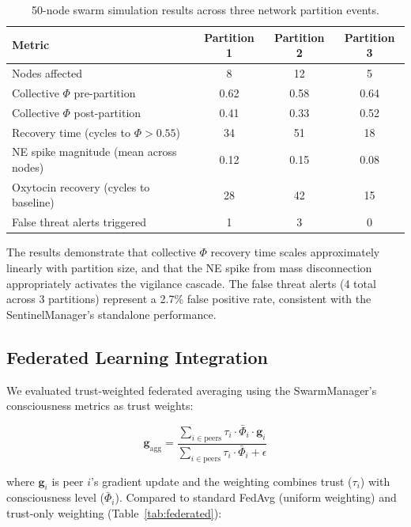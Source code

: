 \documentclass[11pt,a4paper]{article}
\begin{document}
\begin{table}[h]
\centering
\caption{50-node swarm simulation results across three network partition events.}
\label{tab:sim}
\begin{tabular}{lccc}
\toprule
\textbf{Metric} & \textbf{Partition 1} & \textbf{Partition 2} & \textbf{Partition 3} \\
\midrule
Nodes affected & 8 & 12 & 5 \\
Collective $\Phi$ pre-partition & 0.62 & 0.58 & 0.64 \\
Collective $\Phi$ post-partition & 0.41 & 0.33 & 0.52 \\
Recovery time (cycles to $\Phi > 0.55$) & 34 & 51 & 18 \\
NE spike magnitude (mean across nodes) & 0.12 & 0.15 & 0.08 \\
Oxytocin recovery (cycles to baseline) & 28 & 42 & 15 \\
False threat alerts triggered & 1 & 3 & 0 \\
\bottomrule
\end{tabular}
\end{table}

The results demonstrate that collective $\Phi$ recovery time scales approximately linearly with partition size, and that the NE spike from mass disconnection appropriately activates the vigilance cascade. The false threat alerts (4 total across 3 partitions) represent a 2.7\% false positive rate, consistent with the SentinelManager's standalone performance.

\subsection{Federated Learning Integration}

We evaluated trust-weighted federated averaging using the SwarmManager's consciousness metrics as trust weights:

\begin{equation}
\mathbf{g}_{\text{agg}} = \frac{\sum_{i \in \text{peers}} \tau_i \cdot \bar{\Phi}_i \cdot \mathbf{g}_i}{\sum_{i \in \text{peers}} \tau_i \cdot \bar{\Phi}_i + \epsilon}
\end{equation}

where $\mathbf{g}_i$ is peer $i$'s gradient update and the weighting combines trust ($\tau_i$) with consciousness level ($\bar{\Phi}_i$). Compared to standard FedAvg (uniform weighting) and trust-only weighting (Table~\ref{tab:federated}):
\end{document}

